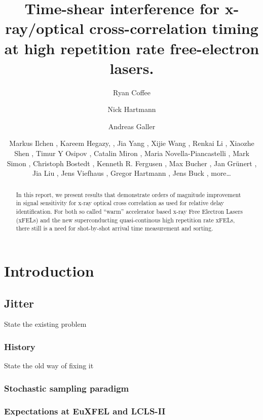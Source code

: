 \documentclass{article}
\begin{document}
\author{Ryan Coffee}
\author{Nick Hartmann}
\author{Andreas Galler}
\author{Markus Ilchen
, Kareem Hegazy, 
, Jia Yang
, Xijie Wang
, Renkai Li
, Xiaozhe Shen
, Timur Y Osipov
, Catalin Miron
, Maria Novella-Piancastelli
, Mark Simon
, Christoph Bostedt
, Kenneth R. Fergusen
, Max Bucher
, Jan Gr\"{u}nert
, Jia Liu
, Jens Viefhaus
, Gregor Hartmann
, Jens Buck
, more\ldots}

\title{Time-shear interference for x-ray/optical cross-correlation timing at high repetition rate free-electron lasers.}

\begin{abstract}
In this report, we present results that demonstrate orders of magnitude improvement in signal sensitivity for x-ray optical cross correlation as used for relative delay identification.
For both so called ``warm'' accelerator based x-ray Free Electron Lasers (xFELs) and the new superconducting quasi-continous high repetition rate xFELs, there still is a need for shot-by-shot arrival time measurement and sorting.

\end{abstract}

\maketitle


\section{Introduction}
\subsection{Jitter}
State the existing problem
\subsubsection{History}
State the old way of fixing it
\subsubsection{Stochastic sampling paradigm}
\subsubsection{Expectations at EuXFEL and LCLS-II}
\end{document}
